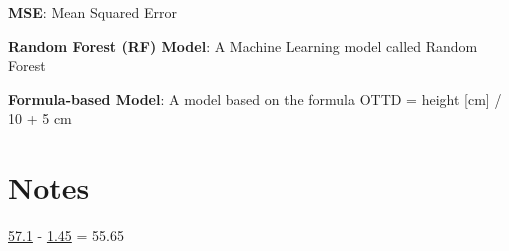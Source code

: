 \documentclass[11pt]{article}
\begin{document}
\begin{codeoutput}
\begin{table}[h]
\caption{Comparison of Mean Squared Errors (MSE) between RandomForest (ML) model and Formula-based model}
\label{table:ComparisonResiduals}
\begin{threeparttable}
\renewcommand{\TPTminimum}{\linewidth}
\begin{tablenotes}
\footnotesize
\item \textbf{MSE}: Mean Squared Error
\item \textbf{Random Forest (RF) Model}: A Machine Learning model called Random Forest
\item \textbf{Formula-based Model}: A model based on the formula OTTD = height [cm] / 10 + 5 cm
\end{tablenotes}
\end{threeparttable}
\end{table}

\end{codeoutput}

\section{Notes}

\noindent

\hyperlink{A2a}{57.1} - \hyperlink{A1a}{1.45} = 55.65
\end{document}
